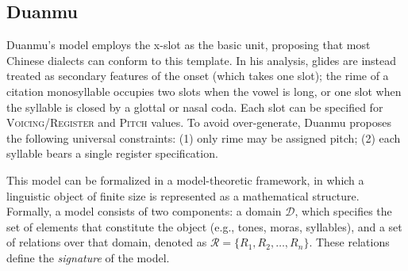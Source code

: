 \documentclass[11pt]{article}
\begin{document}
\subsection{Duanmu}
Duanmu’s model employs the x-slot as the basic unit, proposing that most
Chinese dialects can conform to this template. In his analysis, glides 
are instead treated as secondary features of the onset (which takes one
slot); the rime of a citation monosyllable occupies two slots when the vowel
is long, or one slot when the syllable is closed by a glottal or nasal coda.
Each slot can be specified for \textsc{Voicing/Register} and \textsc{Pitch}
values. To avoid over-generate, Duanmu proposes the following universal
constraints: (1) only rime may be assigned pitch; (2) each syllable bears a 
single register specification. 

This model can be formalized in a model-theoretic framework, in which a linguistic 
object of finite size is represented as a mathematical structure. Formally, a 
model consists of two components: a domain $\mathcal{D}$, which specifies the set 
of elements that constitute the object (e.g., tones, moras, syllables), and a set 
of relations over that domain, denoted as $\mathcal{R} = \{ R_1, R_2, \dots, R_n 
\}$. These relations define the \textit{signature }of the model.
\end{document}
